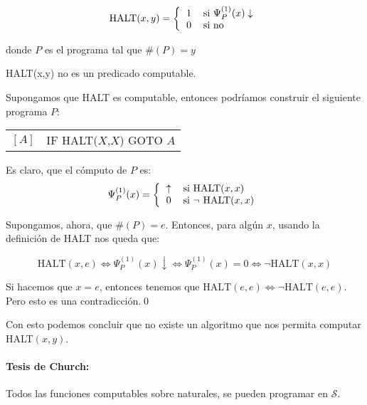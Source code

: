 \begin{align*}
	\text{HALT}(x,y) = \left\{
	\begin{tabular}{ll}
		1 & si $\Psi_P^{(1)}(x)\downarrow$ \\
		0 & si no \\  
	\end{tabular}
	\right.
\end{align*}

donde $P$ es el programa tal que $\#(P) = y$

\begin{teorema}\label{teorema::haltNoComputable}
	HALT(x,y) no es un predicado computable.
\end{teorema}

\begin{demo}
	Supongamos que HALT es computable, entonces podríamos construir el siguiente programa $P$:
	
	\begin{center}
		\begin{tabular}{ll}
			$[A]$ & IF HALT($X$,$X$) GOTO $A$
		\end{tabular}
	\end{center}

Es claro, que el cómputo de $P$ es:
\begin{align*}
\Psi_P^{(1)}(x) = \left\{
\begin{tabular}{ll}
$\uparrow$ & si HALT($x,x)$ \\
0 & si $\lnot$ HALT($x,x$) \\
\end{tabular}
\right.
\end{align*}

Supongamos, ahora, que $\#(P) = e$. Entonces, para algún $x$, usando la definición de HALT nos queda que:

$$ \text{HALT}(x,e) \iff \Psi_P^{(1)}(x)\downarrow \iff \Psi_P^{(1)}(x) = 0 \iff \lnot\text{HALT}(x,x)$$

Si hacemos que $x = e$, entonces tenemos que $\text{HALT}(e,e) \iff  \lnot\text{HALT}(e,e)$. Pero esto es una contradicción.\qed
\end{demo}

Con esto podemos concluir que no existe un algoritmo que nos permita computar HALT$(x,y)$.

\paragraph{Tesis de Church:} Todos las funciones computables sobre naturales, se pueden programar en $\mathcal{S}$.

